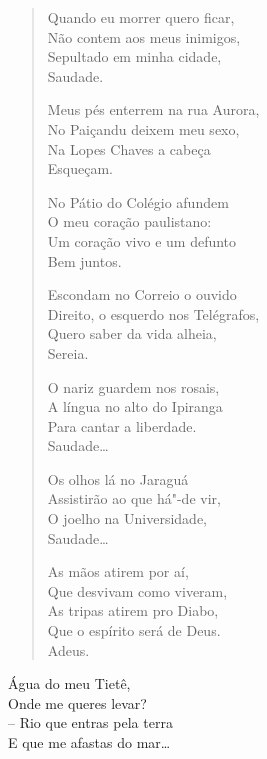 \pagebreak
{}

\begin{verse}
Quando eu morrer quero ficar,\\
Não contem aos meus inimigos,\\
Sepultado em minha cidade,\\
\quad\quad{}Saudade.

Meus pés enterrem na rua Aurora,\\
No Paiçandu deixem meu sexo,\\
Na Lopes Chaves a cabeça\\
\quad\quad{}Esqueçam.

No Pátio do Colégio afundem\\
O meu coração paulistano:\\
Um coração vivo e um defunto\\
\quad\quad{}Bem juntos.

Escondam no Correio o ouvido\\
Direito, o esquerdo nos Telégrafos,\\
Quero saber da vida alheia,\\
\quad\quad{}Sereia.

O nariz guardem nos rosais,\\
A língua no alto do Ipiranga\\
Para cantar a liberdade.\\
\quad\quad{}Saudade\ldots{}

Os olhos lá no Jaraguá\\
Assistirão ao que há"-de vir,\\
O joelho na Universidade,\\
\quad\quad{}Saudade\ldots{}

As mãos atirem por aí,\\
Que desvivam como viveram,\\
As tripas atirem pro Diabo,\\
Que o espírito será de Deus.\\
\quad\quad{}Adeus.
\end{verse}



\epigraph{Água do meu Tietê,\\
Onde me queres levar?\\
-- Rio que entras pela terra\\
E que me afastas do mar\ldots{}}{}

